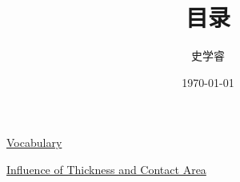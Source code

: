 \documentclass[UTF8]{ctexart}
\begin{document}
    

\title{目录}
\author{史学睿}
\date{\today}
\maketitle

\href{Vocabulary/Vocabulary.pdf}{Vocabulary}

\href{First/First.pdf}{Influence of Thickness and Contact Area}
\end{document}
